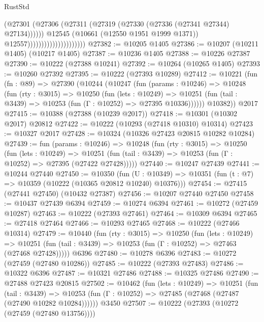 \begin{lexlean}{RustStd}
\begin{coremodule}
                                              (@27301
                                                (@27306
                                                  (@27311
                                                    (@27319
                                                      (@27330 (@27336 (@27341 @27344) @27134))))))
                                              @12545
                                              (@10661 (@12550 @1951 @1999 @1371))
                                              @12557)))))))))))))))))))))
@27382 := @10205 @1405
@27386 := @10207 (@10211 @1405) (@10217 @1405)
@27387 := @10236 @1405
@27388 := @10226 @27387
@27390 := @10222 (@27388 @10241)
@27392 := @10264 (@10265 @1405)
@27393 := @10260 @27392
@27395 := @10222 (@27393 @10289)
@27412 := @10221
    (fun (fn : @89) =>
    @27390
      (@10244
        (@10247
          (fun (params : @10246) =>
          @10248
            (fun (rty : @3015) =>
            @10250
              (fun (lets : @10249) =>
              @10251 (fun (tail : @3439) => @10253 (fun (Γ : @10252) => @27395 @10336))))))
        @10382))
    @2017
@27415 := @10388 (@27388 (@10239 @2017))
@27418 := @10301 (@10302 @2017) @20812
@27422 := @10222 (@10293 (@27418 @10310) @10314)
@27423 := @10327 @2017
@27428 := @10324 (@10326 @27423 @20815 @10282 @10284)
@27439 := fun (params : @10246) =>
  @10248
    (fun (rty : @3015) =>
    @10250
      (fun (lets : @10249) =>
      @10251 (fun (tail : @3439) => @10253 (fun (Γ : @10252) => @27395 (@27422 @27428)))))
@27440 := @10247 @27439
@27441 := @10244 @27440
@27450 := @10350
    (fun (U : @10349) => @10351 (fun (t : @7) => @10359 (@10222 (@10365 @20812 @10240) @10376)))
@27454 := @27415 (@27441 @27450) (@10432 @27387)
@27456 := @10207 @27440 @27450
@27458 := @10437 @27439 @6394
@27459 := @10274 @6394
@27461 := @10272 (@27459 @10287)
@27463 := @10222 (@27393 @27461)
@27464 := @10309 @6394
@27465 := @27418 @27464
@27466 := @10293 @27465
@27468 := @10222 (@27466 @10314)
@27479 := @10440
    (fun (rty : @3015) =>
    @10250
      (fun (lets : @10249) =>
      @10251 (fun (tail : @3439) => @10253 (fun (Γ : @10252) => @27463 (@27468 @27428)))))
    @6396
@27480 := @10278 @6396
@27483 := @10272 (@27459 (@27480 @10286))
@27485 := @10222 (@27393 @27483)
@27486 := @10322 @6396
@27487 := @10321 @27486
@27488 := @10325 @27486
@27490 := @27488 @27423 @20815
@27502 := @10462
    (fun (lets : @10249) =>
    @10251
      (fun (tail : @3439) =>
      @10253 (fun (Γ : @10252) => @27485 (@27468 (@27487 (@27490 @10282 @10284))))))
    @3450
@27507 := @10222 (@27393 (@10272 (@27459 (@27480 @13756))))

\end{coremodule}
\end{lexlean}
